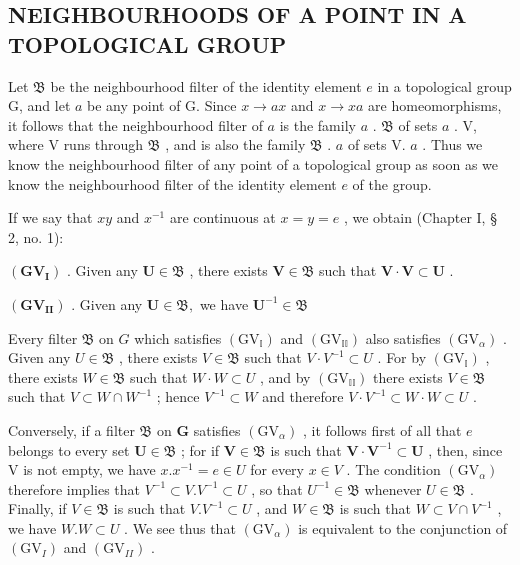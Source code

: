 \subsection{NEIGHBOURHOODS OF A POINT IN A TOPOLOGICAL GROUP}

Let \(\mathfrak{B}\) be the neighbourhood filter of the identity element \(e\) in a topological group G, and let \(a\) be any point of G. Since \(x \to ax\) and \(x \to xa\) are homeomorphisms, it follows that the neighbourhood filter of \(a\) is the family \(a\) . \(\mathfrak{B}\) of sets \(a\) . V, where V runs through \(\mathfrak{B}\) , and is also the family \(\mathfrak{B}\) . \(a\) of sets V. \(a\) . Thus we know the neighbourhood filter of any point of a topological group as soon as we know the neighbourhood filter of the identity element \(e\) of the group.

If we say that \(xy\) and \(x^{-1}\) are continuous at \(x = y = e\) , we obtain (Chapter I, § 2, no. 1):

\((\mathbf{GV}_{\mathbf{I}})\) . Given any \(\mathbf{U} \in \mathfrak{B}\) , there exists \(\mathbf{V} \in \mathfrak{B}\) such that \(\mathbf{V} \cdot \mathbf{V} \subset \mathbf{U}\) .

\((\mathbf{GV}_{\mathbf{II}})\) . Given any \(\mathbf{U}\in \mathfrak{B},\) we have \(\mathbf{U}^{-1}\in \mathfrak{B}\)

Every filter \(\mathfrak{B}\) on \(G\) which satisfies \((\mathrm{GV}_{\mathbb{I}})\) and \((\mathrm{GV}_{\mathbb{II}})\) also satisfies \((\mathrm{GV}_{\alpha})\) . Given any \(U \in \mathfrak{B}\) , there exists \(V \in \mathfrak{B}\) such that \(V \cdot V^{-1} \subset U\) . For by \((\mathrm{GV}_{\mathbb{I}})\) , there exists \(W \in \mathfrak{B}\) such that \(W \cdot W \subset U\) , and by \((\mathrm{GV}_{\mathbb{II}})\) there exists \(V \in \mathfrak{B}\) such that \(V \subset W \cap W^{-1}\) ; hence \(V^{-1} \subset W\) and therefore \(V \cdot V^{-1} \subset W \cdot W \subset U\) .

Conversely, if a filter \(\mathfrak{B}\) on \(\mathbf{G}\) satisfies \((\mathrm{GV}_{\alpha})\) , it follows first of all that \(e\) belongs to every set \(\mathbf{U} \in \mathfrak{B}\) ; for if \(\mathbf{V} \in \mathfrak{B}\) is such that \(\mathbf{V} \cdot \mathbf{V}^{-1} \subset \mathbf{U}\) , then, since V is not empty, we have \(x.x^{-1}=e\in U\) for every \(x\in V\) . The condition \((\mathrm{GV}_{\alpha})\) therefore implies that \(V^{-1}\subset V.V^{-1}\subset U\) , so that \(U^{-1}\in\mathfrak{B}\) whenever \(U\in\mathfrak{B}\) . Finally, if \(V\in\mathfrak{B}\) is such that \(V.V^{-1}\subset U\) , and \(W\in\mathfrak{B}\) is such that \(W\subset V\cap V^{-1}\) , we have \(W.W\subset U\) . We see thus that \((\mathrm{GV}_{\alpha})\) is equivalent to the conjunction of \((\mathrm{GV}_{I})\) and \((\mathrm{GV}_{II})\) .

